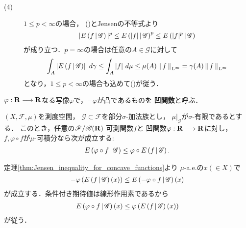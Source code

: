 \begin{prf}
\begin{description}
			\item[(4)] 
				$1 \leq p < \infty$の場合，
				()とJensenの不等式より
				\begin{align}
					|E\left( f \, \middle|\, \mathscr{G} \right)|^p \leq E\left( |f| \, \middle|\, \mathscr{G} \right)^p
					\leq E\left( |f|^p \, \middle|\, \mathscr{G} \right)
				\end{align}
				が成り立つ．$p = \infty$の場合は任意の$A \in \mathscr{G}$に対して
				\begin{align}
					\int_A \left| E\left( f \, \middle|\, \mathscr{G} \right) \right|\ d\gamma
					\leq \int_A |f|\ d\mu
					\leq \mu(A) \left\|\, f\, \right\|_{L^\infty}
					= \gamma(A) \left\|\, f\, \right\|_{L^\infty}
				\end{align}
				となり，$1 \leq p < \infty$の場合も込めて()が従う．
				\QED
		\end{description}
	\end{prf}
	
	$\varphi:\mathbf{R} \longrightarrow \mathbf{R}$なる写像$\varphi$で，$-\varphi$が凸であるものを
	{\bf 凹関数}と呼ぶ．
	
	\begin{screen}
		\begin{thm}[凹関数に対するJensenの不等式]\label{thm:Jensen_inequality_for_concave_functions}
			$(X,\mathscr{F},\mu)$を測度空間，
			$\mathscr{G} \subset \mathscr{F}$を部分$\sigma$-加法族とし，
			$\left. \mu \right|_{\mathscr{G}}$が$\sigma$-有限であるとする．
			このとき，任意の$\mathscr{F}/\mathscr{B}(\mathbf{R})$-可測関数$f$と
			凹関数$\varphi:\mathbf{R} \longrightarrow \mathbf{R}$に対し，
			$f,\varphi \circ f$が$\mu$-可積分なら次が成立する:
			\begin{align}
				E\left( \varphi \circ f \, \middle|\, \mathscr{G} \right)
				\leq \varphi \circ E\left( f \, \middle|\, \mathscr{G} \right).
			\end{align}
		\end{thm}
	\end{screen}
	
	\begin{prf}
		定理\ref{thm:Jensen_inequality_for_concave_functions}より
		$\mu$-a.e.の$x( \in X)$で
		\begin{align}
			-\varphi\left(E\left( f \, \middle|\, \mathscr{G} \right)(x)\right) \leq E\left( -\varphi \circ f \, \middle|\, \mathscr{G} \right)(x)
		\end{align}
		が成立する．条件付き期待値は線形作用素であるから
		\begin{align}
			E\left( \varphi \circ f \, \middle|\, \mathscr{G} \right)(x) \leq \varphi\left(E\left( f \, \middle|\, \mathscr{G} \right)(x)\right)
		\end{align}
		が従う．
		\QED
	\end{prf}
	
